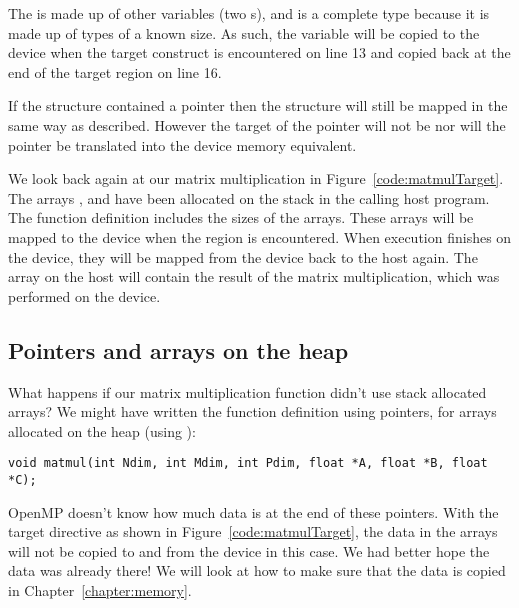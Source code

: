 The  is made up of other variables (two s), and is a complete type because it is made up of types of a known size.
As such, the  variable will be copied to the device when the target construct is encountered on line 13 and copied back at the end of the target region on line 16.

If the structure contained a pointer then the structure will still be mapped in the same way as described.
However the target of the pointer will not be nor will the pointer be translated into the device memory equivalent.

We look back again at our matrix multiplication in Figure~\ref{code:matmulTarget}.
The arrays ,  and  have been allocated on the stack in the calling host program.
The  function definition includes the sizes of the arrays.
These arrays will be mapped to the device when the  region is encountered.
When execution finishes on the device, they will be mapped from the device back to the host again.
The  array on the host will contain the result of the matrix multiplication, which was performed on the device.


\subsection{Pointers and arrays on the heap}

What happens if our matrix multiplication function didn't use stack allocated arrays?
We might have written the function definition using pointers, for arrays allocated on the heap (using ):
\begin{verbatim}
void matmul(int Ndim, int Mdim, int Pdim, float *A, float *B, float *C);
\end{verbatim}

OpenMP doesn't know how much data is at the end of these pointers.
With the target directive as shown in Figure~\ref{code:matmulTarget}, the data in the arrays will not be copied to and from the device in this case.
We had better hope the data was already there!
We will look at how to make sure that the data is copied in Chapter~\ref{chapter:memory}.


